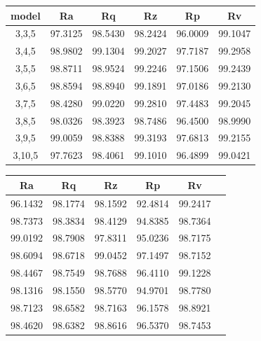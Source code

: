\documentclass[suppldata]{interact}
\begin{document}
     \begin{minipage}{0.40\textwidth}
        \small
 \centering
    \begin{tabular}{|c|c|c|c|c|c|}
    \hline
      model & Ra &  Rq &  Rz &  Rp & Rv \\ \hline
    3,3,5 & 97.3125 & 98.5430 & 98.2424 & 96.0009 & 99.1047 \\ \hline
       3,4,5 & 98.9802 & 99.1304 & 99.2027 & 97.7187 & 99.2958 \\ \hline
        3,5,5 &98.8711 & 98.9524 & 99.2246 & 97.1506 & 99.2439 \\ \hline
        3,6,5 &98.8594 & 98.8940 & 99.1891 & 97.0186 & 99.2130 \\ \hline
        3,7,5 &98.4280 & 99.0220 & 99.2810 & 97.4483 & 99.2045 \\ \hline
        3,8,5 &98.0326 & 98.3923 & 98.7486 & 96.4500 & 98.9990 \\ \hline
        3,9,5 &99.0059 & 98.8388 & 99.3193 & 97.6813 & 99.2155 \\ \hline
        3,10,5 &97.7623 & 98.4061 & 99.1010 & 96.4899 & 99.0421 \\ \hline
    \end{tabular}
        \label{tab:lmr2tr}
    \end{minipage}
    \hfill 
    \begin{minipage}{0.33\textwidth}
    \small
 \centering
    \begin{tabular}{|c|c|c|c|c|c|}
    \hline
        Ra &  Rq &  Rz &  Rp & Rv \\ \hline
        96.1432 & 98.1774 & 98.1592 & 92.4814 & 99.2417 \\ \hline
        98.7373 & 98.3834 & 98.4129 & 94.8385 & 98.7364 \\ \hline
        99.0192 & 98.7908 & 97.8311 & 95.0236 & 98.7175 \\ \hline
        98.6094 & 98.6718 & 99.0452 & 97.1497 & 98.7152 \\ \hline
        98.4467 & 98.7549 & 98.7688 & 96.4110 & 99.1228 \\ \hline
        98.1316 & 98.1550 & 98.5770 & 94.9701 & 98.7780 \\ \hline
        98.7123 & 98.6582 & 98.7163 & 96.1578 & 98.8921 \\ \hline
        98.4620 & 98.6382 & 98.8616 & 96.5370 & 98.7453 \\ \hline
     \end{tabular}
     \label{tab:lmr2te}
     \end{minipage}
     
\end{document}
